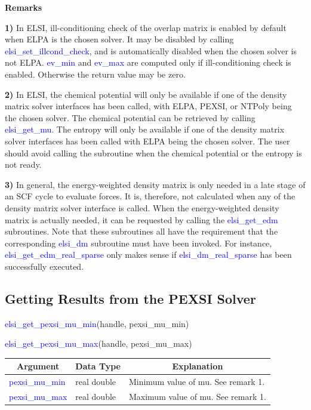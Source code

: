 \documentclass{report}
\begin{document}
\textbf{Remarks}

\textbf{1)} In ELSI, ill-conditioning check of the overlap matrix is enabled by default when ELPA is the chosen solver.  It may be disabled by calling \textcolor{blue}{elsi\_set\_illcond\_check}, and is automatically disabled when the chosen solver is not ELPA.  \textcolor{blue}{ev\_min} and \textcolor{blue}{ev\_max} are computed only if ill-conditioning check is enabled.  Otherwise the return value may be zero.

\textbf{2)} In ELSI, the chemical potential will only be available if one of the density matrix solver interfaces has been called, with ELPA, PEXSI, or NTPoly being the chosen solver.  The chemical potential can be retrieved by calling \textcolor{blue}{elsi\_get\_mu}.  The entropy will only be available if one of the density matrix solver interfaces has been called with ELPA being the chosen solver.  The user should avoid calling the subroutine when the chemical potential or the entropy is not ready.

\textbf{3)} In general, the energy-weighted density matrix is only needed in a late stage of an SCF cycle to evaluate forces.  It is, therefore, not calculated when any of the density matrix solver interface is called.  When the energy-weighted density matrix is actually needed, it can be requested by calling the \textcolor{blue}{elsi\_get\_edm} subroutines.  Note that these subroutines all have the requirement that the corresponding \textcolor{blue}{elsi\_dm} subroutine must have been invoked.  For instance, \textcolor{blue}{elsi\_get\_edm\_real\_sparse} only makes sense if \textcolor{blue}{elsi\_dm\_real\_sparse} has been successfully executed.

\subsection{Getting Results from the PEXSI Solver}
\label{subsec:getter_pexsi}
\begin{labeling}{\hspace{6cm}}
\item [\hspace{0.3cm} \textcolor{blue}{elsi\_get\_pexsi\_mu\_min}(handle, pexsi\_mu\_min)]
\item [\hspace{0.3cm} \textcolor{blue}{elsi\_get\_pexsi\_mu\_max}(handle, pexsi\_mu\_max)]
\end{labeling}

\begin{tabular}[]{|p{30mm}|p{45mm}|p{90mm}|}
\hline
\multicolumn{1}{|c|}{\textbf{Argument}} & \multicolumn{1}{c|}{\textbf{Data Type}} & \multicolumn{1}{c|}{\textbf{Explanation}}\\
\hline
\textcolor{blue}{pexsi\_mu\_min} & real double & Minimum value of mu.  See remark 1.\\
\hline
\textcolor{blue}{pexsi\_mu\_max} & real double & Maximum value of mu.  See remark 1.\\
\hline
\end{tabular}
\end{document}
